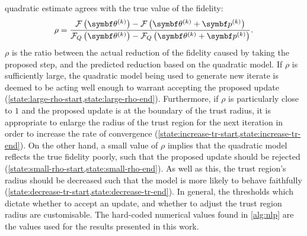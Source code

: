 quadratic estimate agrees with the true value of the fidelity:
\begin{equation}
    \rho = \frac
        {\Fthk - \Fthkpk}
        {\FQthk - \FQthkpk}.
\end{equation}
$\rho$ is the ratio between the actual reduction of the fidelity caused
by taking the proposed step, and the predicted reduction based on the quadratic
model. If $\rho$ is sufficiently large, the quadratic model being
used to generate new iterate is deemed to be acting well enough to warrant
accepting the proposed update
(\cref{state:large-rho-start,state:large-rho-end}).
Furthermore, if $\rho$ is particularly close to $1$ and the proposed
update is at the boundary of the trust radius, it is appropriate to enlarge the
radius of the trust region for the next iteration in order to increase the
rate of convergence
(\cref{state:increase-tr-start,state:increase-tr-end}).
On the other hand, a small value of $\rho$ implies that the
quadratic model reflects the true fidelity poorly, such that the proposed
update should be rejected
(\cref{state:small-rho-start,state:small-rho-end}).
As well as this, the trust region's radius should be
decreased such that the model is more likely to behave faithfully
(\cref{state:decrease-tr-start,state:decrease-tr-end}). In general, the
thresholds which dictate whether to accept an update, and whether to adjust the
trust region radius are customisable. The hard-coded numerical values found in
\cref{alg:nlp} are the values used for the results presented in this work.

